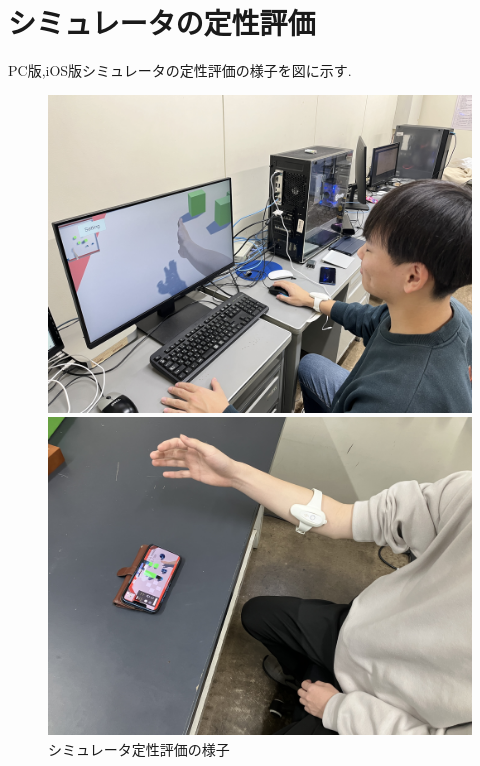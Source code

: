 \documentclass{ltjsreport}
\begin{document}
	\section{シミュレータの定性評価}
		PC版,iOS版シミュレータの定性評価の様子を図に示す.
		\begin{figure}[H]
		\centering
		\begin{minipage}{0.4\columnwidth}
		\centering
		\includegraphics[width = \columnwidth]{../figs/IMG_5132.JPG}
		\end{minipage}
		\hspace{0.04\columnwidth}
		\begin{minipage}{0.4\columnwidth}
		\centering
		\includegraphics[width = \columnwidth]{../figs/IMG_6323.jpg}
		\end{minipage}
		\caption{シミュレータ定性評価の様子}
		\label{fig:simuraterimage}
		\end{figure}
		\vspace{-15pt}
\end{document}
